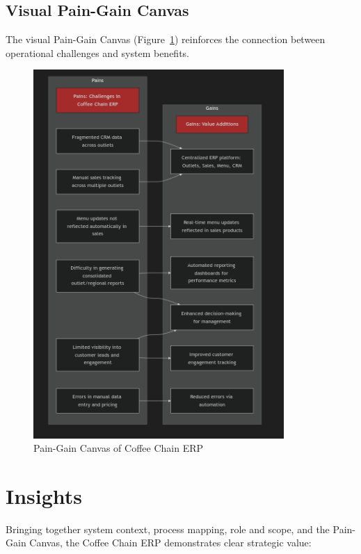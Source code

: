 \subsection*{Visual Pain-Gain Canvas}
The visual Pain-Gain Canvas (Figure~\ref{fig:pain_gain}) reinforces the connection between operational challenges and system benefits.
\begin{figure}[H]
\centering
\includegraphics[width=0.85\textwidth,height=0.6\textheight,keepaspectratio]{diagrams/pain_gain.png}
\caption{Pain-Gain Canvas of Coffee Chain ERP}
\label{fig:pain_gain}
\end{figure}

\section*{Insights}

Bringing together system context, process mapping, role and scope, and the Pain-Gain Canvas, the Coffee Chain ERP demonstrates clear strategic value:

